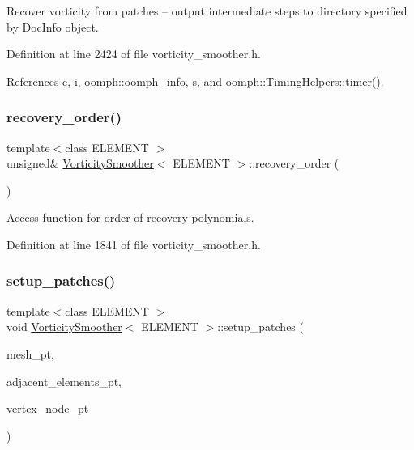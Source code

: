 Recover vorticity from patches -- output intermediate steps to directory specified by Doc\+Info object. 



Definition at line 2424 of file vorticity\+\_\+smoother.\+h.



References e, i, oomph\+::oomph\+\_\+info, s, and oomph\+::\+Timing\+Helpers\+::timer().

\mbox{\label{classVorticitySmoother_a05a61dc88d10b4ebd5c932fbea2b026c}} 
\subsubsection{\texorpdfstring{recovery\+\_\+order()}{recovery\_order()}}
{\footnotesize\ttfamily template$<$class E\+L\+E\+M\+E\+NT $>$ \\
unsigned\& \hyperlink{classVorticitySmoother}{Vorticity\+Smoother}$<$ E\+L\+E\+M\+E\+NT $>$\+::recovery\+\_\+order (\begin{DoxyParamCaption}{ }\end{DoxyParamCaption})\hspace{0.3cm}{\ttfamily [inline]}}



Access function for order of recovery polynomials. 



Definition at line 1841 of file vorticity\+\_\+smoother.\+h.

\mbox{\label{classVorticitySmoother_ada5ca8e3f98cd2d6eab2cd88af7e66a2}} 
\subsubsection{\texorpdfstring{setup\+\_\+patches()}{setup\_patches()}}
{\footnotesize\ttfamily template$<$class E\+L\+E\+M\+E\+NT $>$ \\
void \hyperlink{classVorticitySmoother}{Vorticity\+Smoother}$<$ E\+L\+E\+M\+E\+NT $>$\+::setup\+\_\+patches (\begin{DoxyParamCaption}\item[{Mesh $\ast$\&}]{mesh\+\_\+pt,  }\item[{std\+::map$<$ Node $\ast$, Vector$<$ E\+L\+E\+M\+E\+NT $\ast$$>$ $\ast$$>$ \&}]{adjacent\+\_\+elements\+\_\+pt,  }\item[{Vector$<$ Node $\ast$$>$ \&}]{vertex\+\_\+node\+\_\+pt }\end{DoxyParamCaption})\hspace{0.3cm}{\ttfamily [inline]}}



